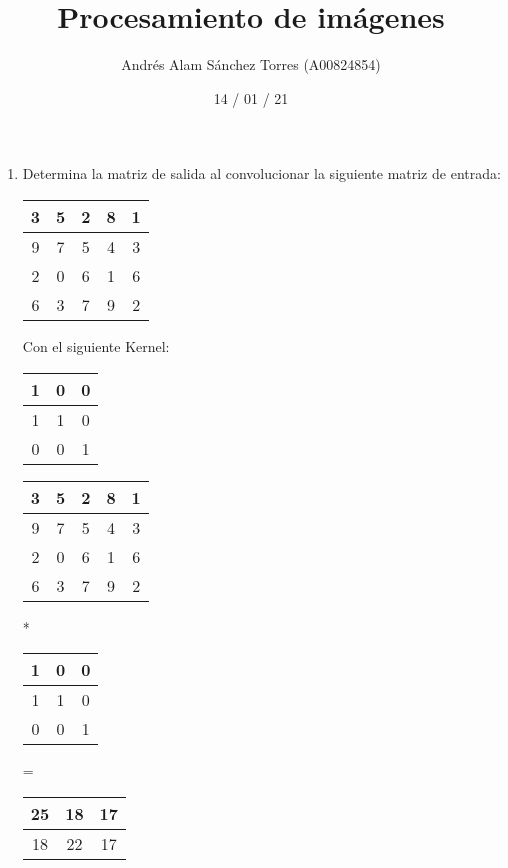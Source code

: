 \documentclass[]{article}
\title{\textbf{Procesamiento de imágenes}}
\date{\small 14 / 01 / 21}
\author{\small Andrés Alam Sánchez Torres (A00824854)}
\begin{document}
\maketitle

\begin{enumerate}
    \item Determina la matriz de salida al convolucionar la siguiente matriz de entrada:
    
    \begin{center}
        \begin{tabular}[]{| c | c | c | c | c | }
            \hline
            3 & 5 & 2 & 8 & 1 \\
            \hline
            9 & 7 & 5 & 4 & 3 \\
            \hline
            2 & 0 & 6 & 1 & 6 \\
            \hline
            6 & 3 & 7 & 9 & 2 \\
            \hline
        \end{tabular}
    \end{center}

    Con el siguiente Kernel:

    \begin{center}
        \begin{tabular}[]{| c | c | c |}
            \hline
            1 & 0 & 0 \\
            \hline
            1 & 1 & 0 \\
            \hline
            0 & 0 & 1 \\
            \hline
        \end{tabular}
    \end{center}

    \begin{center}
        \begin{tabular}[]{| c | c | c | c | c | }
            \hline
            3 & 5 & 2 & 8 & 1 \\
            \hline
            9 & 7 & 5 & 4 & 3 \\
            \hline
            2 & 0 & 6 & 1 & 6 \\
            \hline
            6 & 3 & 7 & 9 & 2 \\
            \hline
        \end{tabular}
        *
        \begin{tabular}[]{| c | c | c |}
            \hline
            1 & 0 & 0 \\
            \hline
            1 & 1 & 0 \\
            \hline
            0 & 0 & 1 \\
            \hline
        \end{tabular}
        =
        \begin{tabular}[]{| c | c | c | }
            \hline
            25 & 18 & 17 \\
            \hline
            18 & 22 & 17 \\
            \hline
        \end{tabular}
    \end{center}



\end{enumerate}
\end{document}
